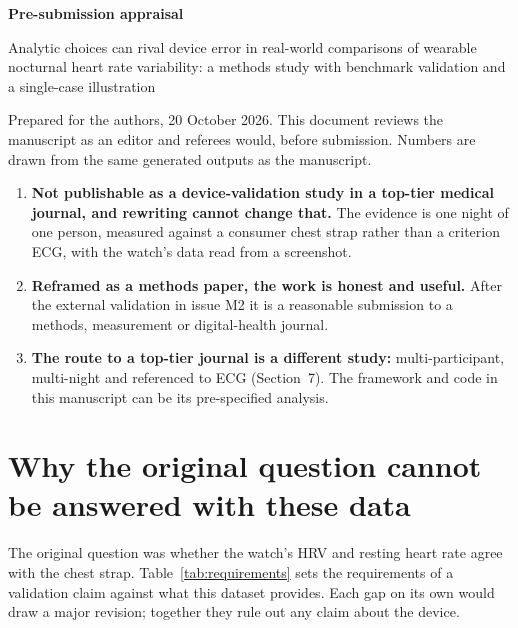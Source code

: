 \documentclass[11pt,a4paper]{article}
\begin{document}
\thispagestyle{plain}

{\sffamily\bfseries\LARGE Pre-submission appraisal\par}
\vspace{6pt}
{\large Analytic choices can rival device error in real-world comparisons of wearable nocturnal heart rate variability: a methods study with benchmark validation and a single-case illustration\par}
\vspace{6pt}
{\small\color{inksoft} Prepared for the authors, 20 October 2026. This document reviews the manuscript as an editor and referees would, before submission. Numbers are drawn from the same generated outputs as the manuscript.\par}
\vspace{8pt}

\begin{verdict}
\begin{enumerate}[leftmargin=1.3em]
\item \textbf{Not publishable as a device-validation study in a top-tier medical journal, and rewriting cannot change that.} The evidence is one night of one person, measured against a consumer chest strap rather than a criterion ECG, with the watch's data read from a screenshot.
\item \textbf{Reframed as a methods paper, the work is honest and useful.} After the external validation in issue M2 it is a reasonable submission to a methods, measurement or digital-health journal.
\item \textbf{The route to a top-tier journal is a different study:} multi-participant, multi-night and referenced to ECG (Section~7). The framework and code in this manuscript can be its pre-specified analysis.
\end{enumerate}
\end{verdict}

\section{Why the original question cannot be answered with these data}
The original question was whether the watch's HRV and resting heart rate agree with the chest strap. Table~\ref{tab:requirements} sets the requirements of a validation claim against what this dataset provides. Each gap on its own would draw a major revision; together they rule out any claim about the device.
\end{document}
